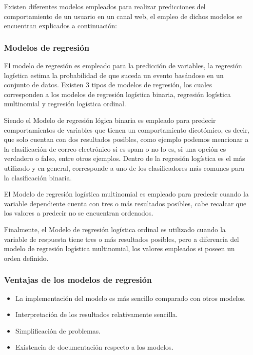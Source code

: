 Existen diferentes modelos empleados para realizar predicciones del comportamiento de un usuario en un canal web, el empleo de dichos modelos se encuentran explicados a continuación:

\subsubsection{Modelos de regresión}
El modelo de regresión es empleado para la predicción de variables, la regresión logística estima la probabilidad de que suceda un evento basándose en un conjunto de datos. Existen 3 tipos de modelos de regresión, los cuales corresponden a los modelos de regresión logística binaria, regresión logística multinomial y regresión logística ordinal.

Siendo el Modelo de regresión lógica binaria es empleado para predecir comportamientos de variables que tienen un comportamiento dicotómico, es decir, que solo cuentan con dos resultados posibles, como ejemplo podemos mencionar a la clasificación de correo electrónico si es spam o no lo es, si una opción es verdadero o falso, entre otros ejemplos. Dentro de la regresión logística es el más utilizado y en general, corresponde a uno de los clasificadores más comunes para la clasificación binaria.

El Modelo de regresión logística multinomial es empleado para predecir cuando la variable dependiente cuenta con tres o más resultados posibles, cabe recalcar que los valores a predecir no se encuentran ordenados.

Finalmente, el Modelo de regresión logística ordinal es utilizado cuando la variable de respuesta tiene tres o más resultados posibles, pero a diferencia del modelo de regresión logística multinomial, los valores empleados si poseen un orden definido.

\subsubsection{Ventajas de los modelos de regresión}

\begin{itemize}
    \item La implementación del modelo es más sencillo comparado con otros modelos.
    \item Interpretación de los resultados relativamente sencilla.
    \item Simplificación de problemas.
    \item Existencia de documentación respecto a los modelos.
\end{itemize}

